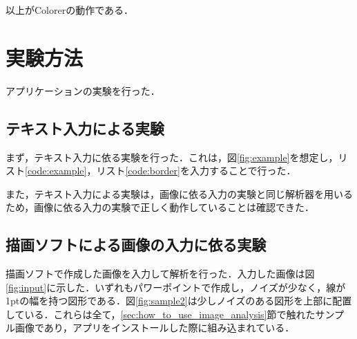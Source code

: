 \documentclass{jarticle}
\begin{document}
以上がColorerの動作である．





\section{実験方法}
アプリケーションの実験を行った．

\subsection{テキスト入力による実験}
まず，テキスト入力に依る実験を行った．これは，図\ref{fig:example}を想定し，リスト\ref{code:example}，リスト\ref{code:border}を入力することで行った．

また，テキスト入力による実験は，画像に依る入力の実験と同じ解析器を用いるため，画像に依る入力の実験で正しく動作していることは確認できた．

\subsection{描画ソフトによる画像の入力に依る実験}
描画ソフトで作成した画像を入力して解析を行った．入力した画像は図\ref{fig:input}に示した．いずれもパワーポイントで作成し，ノイズが少なく，線が1ptの幅を持つ図形である．図\ref{fig:sample2}は少しノイズのある図形を上部に配置している．これらは全て，\ref{sec:how_to_use_image_analysis}節で触れたサンプル画像であり，アプリをインストールした際に組み込まれている．
\end{document}
